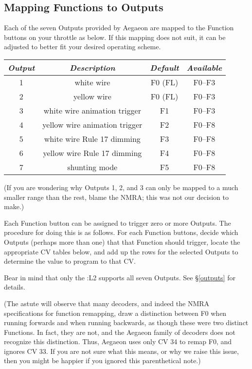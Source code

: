 \documentclass[12pt,letterpaper,draft]{memoir} %
\begin{document}
\subsection{Mapping Functions to Outputs}
\label{remapping}

Each of the seven Outputs provided by Aegaeon are mapped to the Function buttons on your throttle as below. If this mapping does not suit, it can be adjusted to better fit your desired operating scheme.

\begin{center}
\begin{tabular}{|c|c|c|c|}
\hline
\textit{Output} & \textit{Description} & \textit{Default} & \textit{Available} \\ \hline
1 & white wire & F0 (FL) & F0--F3 \\ \hline
2 & yellow wire & F0 (FL) & F0--F3\\ \hline
3 &  white wire animation trigger & F1 & F0--F3\\ \hline
4 & yellow wire animation trigger & F2 & F0--F8\\ \hline
5 & white wire Rule 17 dimming & F3 & F0--F8\\ \hline
6 & yellow wire Rule 17 dimming & F4 & F0--F8\\ \hline
7 & shunting mode & F5 & F0--F8\\ \hline
\end{tabular}
\end{center}

(If you are wondering why Outputs 1, 2, and 3 can only be mapped to a much smaller range than the rest, blame the NMRA; this was not our decision to make.)

Each Function button can be assigned to trigger zero or more Outputs. The procedure for doing this is as follows. For each Function buttons, decide which Outputs (perhaps more than one) that that Function should trigger, locate the appropriate CV tables below, and add up the rows for the selected Outputs to determine the value to program to that CV.

Bear in mind that only the :L2 supports all seven Outputs. See \S\ref{outputs} for details.

(The astute will observe that many decoders, and indeed the NMRA specifications for function remapping, draw a distinction between F0 when running forwards and when running backwards, as though these were two distinct Functions. In fact, they are not, and the Aegaeon family of decoders does not recognize this distinction. Thus, Aegaeon uses only CV 34 to remap F0, and ignores CV 33. If you are not sure what this means, or why we raise this issue, then you might be happier if you ignored this parenthetical note.)
\end{document}
